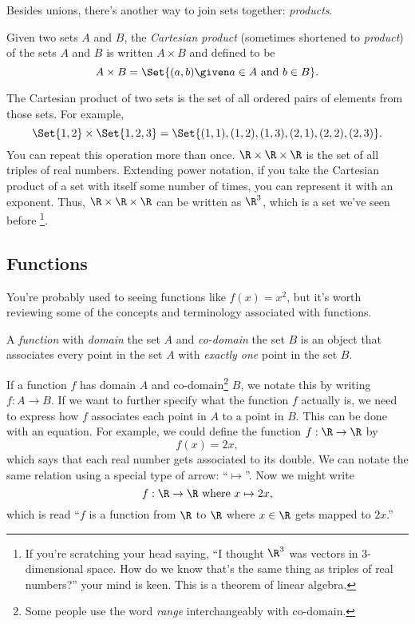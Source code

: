 	Besides unions, there's another way to join sets together:
	\emph{products}.
	\begin{definition}
		Given two sets $A$ and $B$, the \emph{Cartesian product} (sometimes
		shortened to \emph{product}) of the sets $A$ and $B$ is written
		$A\times B$ and defined to be
		\[
			A\times B = \Set{(a,b)\given a\in A\text{ and }b\in B}.
		\]
	\end{definition}
	The Cartesian product of two sets is the set of all ordered pairs of elements from
	those sets.  For example, 
	\[
		\Set{1,2}\times \Set{1,2,3}=\Set{(1,1),(1,2),(1,3),(2,1),(2,2),(2,3)}.
	\]
	You can repeat this operation more than once.   $\R\times \R\times \R$
	is the set of all triples of real numbers.  Extending power
	notation, if you take the Cartesian product of a set
	with itself some number of times, you can represent it with
	an exponent.  Thus, $\R\times \R\times \R$ can be written as $\R^3$, which is a set we've
	seen before%
	\footnote{
		If you're scratching your head saying, ``I thought $\R^3$ was vectors in $3$-dimensional
		space.  How do we know that's the same thing as triples of real numbers?'' your mind
		is keen.  This is a theorem of linear algebra.
	}.

	\subsection{Functions}
	You're probably used to seeing functions like $f(x)=x^2$, but it's worth reviewing some of the concepts
	and terminology associated with functions.

	\begin{definition}[Function]
		A \emph{function} with \emph{domain} the 
		set $A$ and \emph{co-domain} the set $B$ is an object that
		associates every point in the set $A$ with \emph{exactly one} point in the set $B$.
	\end{definition}

	If a function $f$ has domain $A$ and co-domain\footnote{ Some
	people use the word \emph{range} interchangeably with co-domain.} $B$,
	we notate this by writing $f:A\to B$.
	If we want to further specify what the function $f$ actually is, we need to
	express how $f$ associates each point in $A$ to a point in $B$.  This can be done
	with an equation.  For example, we could define the function $f:\R\to\R$ by
	\[
		f(x)=2x,
	\]
	which says that each real number gets associated to its double.  We can notate
	the same relation using a special type of arrow: ``$\mapsto$''.  Now we might write
	\[
		f:\R\to\R\text{ where } x\mapsto 2x,
	\]
	which is read ``$f$ is a function from $\R$ to $\R$ where $x\in \R$ gets mapped to $2x$.''

